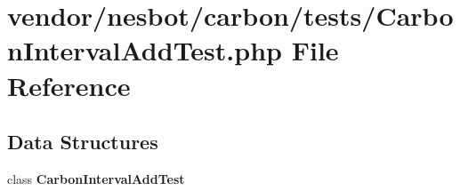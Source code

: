 \section{vendor/nesbot/carbon/tests/\+Carbon\+Interval\+Add\+Test.php File Reference}
\label{_carbon_interval_add_test_8php}
\subsection*{Data Structures}
\begin{DoxyCompactItemize}
\item 
class {\bf Carbon\+Interval\+Add\+Test}
\end{DoxyCompactItemize}
